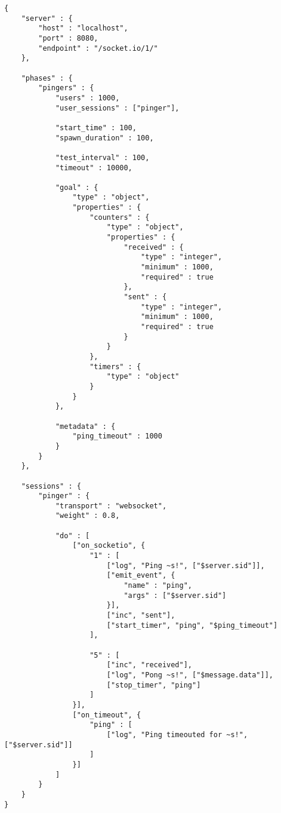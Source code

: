 \documentclass[a4paper]{article}
\begin{document}
\begin{verbatim}
{
    "server" : {
        "host" : "localhost",
        "port" : 8080,
        "endpoint" : "/socket.io/1/"
    },

    "phases" : {
        "pingers" : {
            "users" : 1000,
            "user_sessions" : ["pinger"],

            "start_time" : 100,
            "spawn_duration" : 100,

            "test_interval" : 100,
            "timeout" : 10000,

            "goal" : {
                "type" : "object",
                "properties" : {
                    "counters" : {
                        "type" : "object",
                        "properties" : {
                            "received" : {
                                "type" : "integer",
                                "minimum" : 1000,
                                "required" : true
                            },
                            "sent" : {
                                "type" : "integer",
                                "minimum" : 1000,
                                "required" : true
                            }
                        }
                    },
                    "timers" : {
                        "type" : "object"
                    }
                }
            },

            "metadata" : {
                "ping_timeout" : 1000
            }
        }
    },

    "sessions" : {
        "pinger" : {
            "transport" : "websocket",
            "weight" : 0.8,

            "do" : [
                ["on_socketio", {
                    "1" : [
                        ["log", "Ping ~s!", ["$server.sid"]],
                        ["emit_event", {
                            "name" : "ping",
                            "args" : ["$server.sid"]
                        }],
                        ["inc", "sent"],
                        ["start_timer", "ping", "$ping_timeout"]
                    ],

                    "5" : [
                        ["inc", "received"],
                        ["log", "Pong ~s!", ["$message.data"]],
                        ["stop_timer", "ping"]
                    ]
                }],
                ["on_timeout", {
                    "ping" : [
                        ["log", "Ping timeouted for ~s!", ["$server.sid"]]
                    ]
                }]
            ]
        }
    }
}
\end{verbatim}
\end{document}
